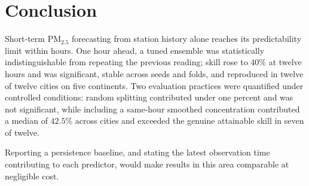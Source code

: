 \documentclass[conference,a4paper]{IEEEtran}
\begin{document}
\section{Conclusion}

Short-term PM$_{2.5}$ forecasting from station history alone reaches its
predictability limit within hours. One hour ahead, a tuned ensemble was
statistically indistinguishable from repeating the previous reading; skill rose
to $40\%$ at twelve hours and was significant, stable across seeds and folds, and
reproduced in twelve of twelve cities on five continents. Two evaluation
practices were quantified under controlled conditions: random splitting
contributed under one percent and was not significant, while including a
same-hour smoothed concentration contributed a median of $42.5\%$ across cities
and exceeded the genuine attainable skill in seven of twelve.

Reporting a persistence baseline, and stating the latest observation time
contributing to each predictor, would make results in this area comparable at
negligible cost.

\end{document}
